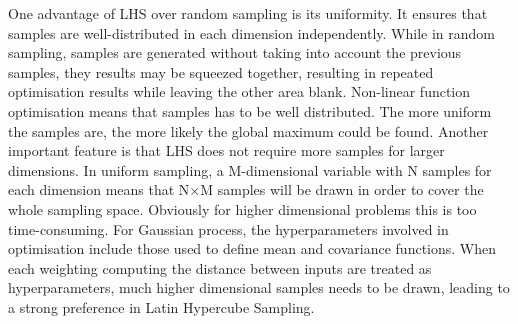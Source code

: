\documentclass[11pt]{report}
\numberwithin{equation}{chapter}
\begin{document}
\begin{spacing}{2}
One advantage of LHS over random sampling is its uniformity. It ensures that samples are well-distributed in each dimension independently. While in random sampling, samples are generated without taking into account the previous samples, they results may be squeezed together, resulting in repeated optimisation results while leaving the other area blank. Non-linear function optimisation means that samples has to be well distributed. The more uniform the samples are, the more likely the global maximum could be found. Another important feature is that LHS does not require more samples for larger dimensions. In uniform sampling, a M-dimensional variable with N samples for each dimension means that N$\times$M samples will be drawn in order to cover the whole sampling space. Obviously for higher dimensional problems this is too time-consuming. For Gaussian process, the hyperparameters involved in optimisation include those used to define mean and covariance functions. When each weighting computing the distance between inputs are treated as hyperparameters, much higher dimensional samples needs to be drawn, leading to a strong preference in Latin Hypercube Sampling.  


\end{spacing}
\end{document}
